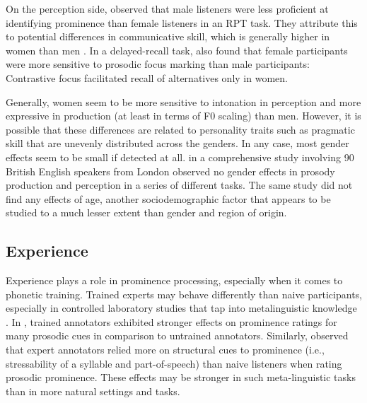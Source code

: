On the perception side, \citet{bishopPhonologyPhoneticsSignalextrinsic2020} observed that male listeners were less proficient at identifying prominence than female listeners in an RPT task. They attribute this to potential differences in communicative skill, which is generally higher in women than men \citep{baron-cohenAutismSpectrumQuotientAQ2001}. In a delayed-recall task, \citet{kochContrastiveIntonationEffects2021} also found that female participants were more sensitive to prosodic focus marking than male participants: Contrastive focus facilitated recall of alternatives only in women.

Generally, women seem to be more sensitive to intonation in perception and more expressive in production (at least in terms of F0 scaling) than men. However, it is possible that these differences are related to personality traits such as pragmatic skill that are unevenly distributed across the genders. In any case, most gender effects seem to be small if detected at all. \citet{peppeProsodicVariationSouthern2000} in a comprehensive study involving 90 British English speakers from London observed no gender effects in prosody production and perception in a series of different tasks. The same study did not find any effects of age, another sociodemographic factor that appears to be studied to a much lesser extent than gender and region of origin.

\subsection{Experience} \label{sec: experience}

Experience plays a role in prominence processing, especially when it comes to phonetic training. Trained experts may behave differently than naive participants, especially in controlled laboratory studies that tap into metalinguistic knowledge \citep[e.g.,][]{laddInfluenceAdjacentPitch1994, royIndividualDifferencesPatterns2017, wagnerExploitingSpeechgestureLink2019}. In \citet{royIndividualDifferencesPatterns2017}, trained annotators exhibited stronger effects on prominence ratings for many prosodic cues in comparison to untrained annotators. Similarly, \citet{wagnerExploitingSpeechgestureLink2019} observed that expert annotators relied more on structural cues to prominence (i.e., stressability of a syllable and part-of-speech) 
than naive listeners when rating prosodic prominence. These effects may be stronger in such meta-linguistic tasks than in more natural settings and tasks.

